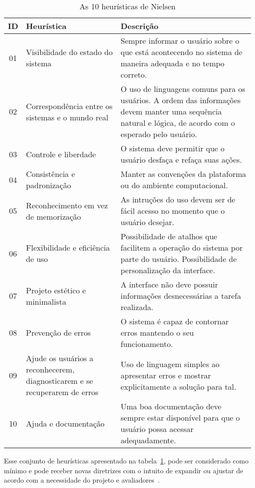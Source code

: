 \begin{table}[!ht]
	\caption{As 10 heurísticas de Nielsen}
	\label{tab:heuristicasnielsen}
	\centering
	\begin{tabular}{ c | m{4cm} | m{10cm} }
		\hline
		ID & Heurística & Descrição \\
		\hline
		01 & Visibilidade do estado do sistema & Sempre informar o usuário sobre o que está acontecendo no sistema de maneira adequada e no tempo correto. \\
		\hline
        02 & Correspondência entre os sistemas e o mundo real & O uso de linguagens comuns para os usuários. A ordem das informações devem manter uma sequência natural e lógica, de acordo com o esperado pelo usuário. \\
		\hline
        03 & Controle e liberdade & O sistema deve permitir que o usuário desfaça e refaça suas ações. \\
		\hline
        04 & Consistência e padronização & Manter as convenções da plataforma ou do ambiente computacional. \\
		\hline
        05 & Reconhecimento em vez de memorização & As intruções do uso devem ser de fácil acesso no momento que o usuário desejar. \\
		\hline
        06 & Flexibilidade e eficiência de uso & Possibilidade de atalhos que facilitem a operação do sistema por parte do usuário. Possibilidade de personalização da interface. \\
		\hline
        07 & Projeto estético e minimalista & A interface não deve possuir informações desnecessárias a tarefa realizada. \\
		\hline
        08 & Prevenção de erros & O sistema é capaz de contornar erros mantendo o seu funcionamento. \\
		\hline
        09 & Ajude os usuários a reconhecerem, diagnosticarem e se recuperarem de erros & Uso de linguagem simples ao apresentar erros e mostrar explicitamente a solução para tal. \\
		\hline
        10 & Ajuda e documentação & Uma boa documentação deve sempre estar disponível para que o usuário possa acessar adequadamente. \\
		\hline
	\end{tabular}
\end{table}

Esse conjunto de heurísticas apresentado na tabela~\ref{tab:heuristicasnielsen}, pode ser considerado como mínimo e pode receber novas diretrizes com o intuito de expandir ou ajustar de acordo com a necessidade do projeto e avaliadores~\cite{barbosa:2010, benyon:2011}.

